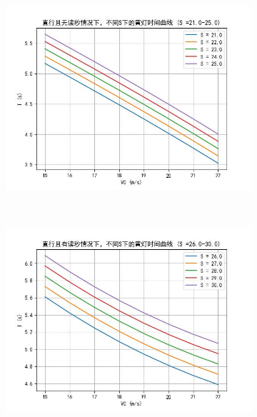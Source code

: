 \documentclass[withoutpreface,bwprint]{cumcmthesis}
\begin{document}
\begin{enumerate}
\begin{figure}[htbp!]
\begin{subfigure}[t]{0.45\textwidth}
			\includegraphics[width=\textwidth]{pics/Time_Curve_S_WOCT_STR25.00}
			\label{fig:S25_WOCT}
		\end{subfigure}
		\\
		\begin{subfigure}[t]{0.45\textwidth}
			\includegraphics[width=\textwidth]{pics/Time_Curve_S_WCT_STR30.00}
			\label{fig:S30_WCT}
		\end{subfigure}
		\hfill
		\begin{subfigure}[t]{0.45\textwidth}

\end{subfigure}
\end{figure}
\end{enumerate}
\end{document}
